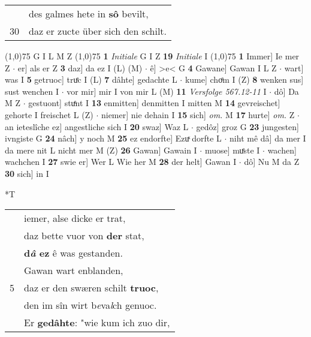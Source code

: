 \documentclass[8pt,a4paper,notitlepage]{article}
\begin{document}
\begin{table}[ht]
\begin{minipage}[t]{0.5\linewidth}
\begin{tabular}{rl}
 & des galmes hete in \textbf{sô} bevilt,\\ 
30 & daz er zucte über sich den schilt.\\ 
\end{tabular}
\scriptsize
\line(1,0){75} \newline
G I L M Z \newline
\line(1,0){75} \newline
\textbf{1} \textit{Initiale} G I Z  \textbf{19} \textit{Initiale} I  \newline
\line(1,0){75} \newline
\textbf{1} Immer] Ie mer Z  $\cdot$ er] als er Z \textbf{3} daz] da ez I (L) (M)  $\cdot$ ê] >e< G \textbf{4} Gawane] Gawan I L Z  $\cdot$ wart] was I \textbf{5} getruoc] truͤc I (L) \textbf{7} dâhte] gedachte L  $\cdot$ kume] choͤm I (Z) \textbf{8} wenken sus] sust wenchen I  $\cdot$ vor mir] mir I von mir L (M) \textbf{11} \textit{Versfolge 567.12-11} I   $\cdot$ dô] Da M Z  $\cdot$ gestuont] stuͤnt I \textbf{13} enmitten] denmitten I mitten M \textbf{14} gevreischet] gehorte I freischet L (Z)  $\cdot$ niemer] nie dehain I \textbf{15} sich] \textit{om.} M \textbf{17} hurte] \textit{om.} Z  $\cdot$ an ieteslîche ez] angestliche sich I \textbf{20} swaz] Waz L  $\cdot$ gedôz] groz G \textbf{23} jungesten] ivngiste G \textbf{24} nâch] y noch M \textbf{25} ez endorfte] Ezuͯ dorfte L  $\cdot$ niht mê dâ] da mer I da mere nit L nicht mer M (Z) \textbf{26} Gawan] Gawain I  $\cdot$ muose] muͤste I  $\cdot$ wachen] wachchen I \textbf{27} swie er] Wer L Wie her M \textbf{28} der helt] Gawan I  $\cdot$ dô] Nu M da Z \textbf{30} sich] in I \newline
\end{minipage}
\hspace{0.5cm}
\begin{minipage}[t]{0.5\linewidth}
\small
\begin{center}*T
\end{center}
\begin{tabular}{rl}
 & iemer, alse dicke er trat,\\ 
 & daz bette vuor von \textbf{der} stat,\\ 
 & \textbf{d\textit{â} ez} ê was gestanden.\\ 
 & Gawan wart enblanden,\\ 
5 & daz er den swæren schilt \textbf{truoc},\\ 
 & den im sîn wirt b\textit{e}va\textit{l}ch genuoc.\\ 
 & Er \textbf{gedâhte}: "wie kum ich zuo dir,\\ 

\end{tabular}
\end{minipage}
\end{table}
\end{document}
